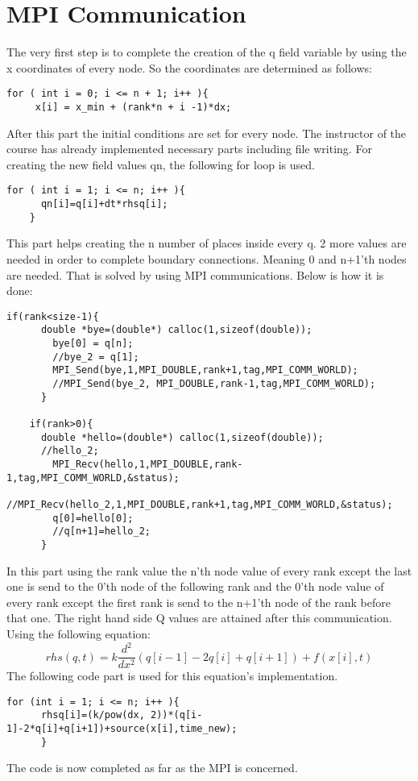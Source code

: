 \documentclass{article}
\begin{document}
\section{MPI Communication}
The very first step is to complete the creation of the q field variable by using the x coordinates of every node. So the coordinates are determined as follows:
\begin{verbatim}
for ( int i = 0; i <= n + 1; i++ ){
     x[i] = x_min + (rank*n + i -1)*dx;
\end{verbatim}
After this part the initial conditions are set for every node. The instructor of the course has already implemented necessary parts including file writing. For creating the new field values qn, the following for loop is used.
\begin{verbatim}
for ( int i = 1; i <= n; i++ ){
      qn[i]=q[i]+dt*rhsq[i];
    }
\end{verbatim}
This part helps creating the n number of places inside every q. 2 more values are needed in order to complete boundary connections. Meaning 0 and n+1'th nodes are needed. That is solved by using MPI communications. Below is how it is done:
\begin{verbatim}
if(rank<size-1){
      double *bye=(double*) calloc(1,sizeof(double));
        bye[0] = q[n];
        //bye_2 = q[1];
        MPI_Send(bye,1,MPI_DOUBLE,rank+1,tag,MPI_COMM_WORLD);
        //MPI_Send(bye_2, MPI_DOUBLE,rank-1,tag,MPI_COMM_WORLD);
      }  
    
    if(rank>0){
      double *hello=(double*) calloc(1,sizeof(double));
      //hello_2;
        MPI_Recv(hello,1,MPI_DOUBLE,rank-1,tag,MPI_COMM_WORLD,&status);
        //MPI_Recv(hello_2,1,MPI_DOUBLE,rank+1,tag,MPI_COMM_WORLD,&status);
        q[0]=hello[0];
        //q[n+1]=hello_2;
      }
\end{verbatim}
In this part using the rank value the n'th node value of every rank except the last one is send to the 0'th node of the following rank and the 0'th node value of every rank except the first rank is send to the n+1'th node of the rank before that one.
The right hand side Q values are attained after this communication. Using the following equation:
\begin{equation}
rhs(q, t) = k \frac{d^2}{dx^2} (q[i - 1] - 2q[i] + q[i + 1]) + f(x[i], t)
\end{equation}
The following code part is used for this equation's implementation.
\begin{verbatim}
for (int i = 1; i <= n; i++ ){
      rhsq[i]=(k/pow(dx, 2))*(q[i-1]-2*q[i]+q[i+1])+source(x[i],time_new);
      }
\end{verbatim}
The code is now completed as far as the MPI is concerned. 
\end{document}
